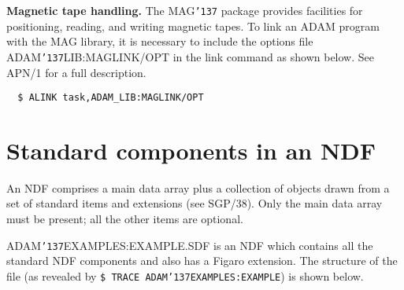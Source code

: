 \documentclass[twoside,11pt]{article}
\renewcommand{\_}{{\tt\char'137}}
\newcommand{\xref}[3]{#1}
\newcommand{\xlabel}[1]{}
\begin{document}
\begin{description}
\item{\bf Magnetic tape handling.}
The MAG\_ package provides facilities for positioning, reading, and writing
magnetic tapes.
To link an ADAM program with the MAG  library, it is necessary to  
include the options file
ADAM\_LIB:MAGLINK/OPT in the link command as shown below.  
See APN/1 for a full 
description.
\begin{verbatim}
  $ ALINK task,ADAM_LIB:MAGLINK/OPT
\end{verbatim}

\end{description}
\newpage

\appendix
\section{Standard components in an NDF\label{apxndf}\xlabel{standard_components_in_an_ndf}}

An NDF comprises a main data array plus a collection of objects drawn from 
a set of standard items and extensions (see \xref{SGP/38}{sgp38}{}).
Only the main data array must be present; all the other items are optional.

ADAM\_EXAMPLES:EXAMPLE.SDF is an NDF which contains all the standard 
NDF components and also has a Figaro extension.
The structure of the file 
(as revealed by {\tt \$ TRACE ADAM\_EXAMPLES:EXAMPLE}) is shown below.
\end{document}
